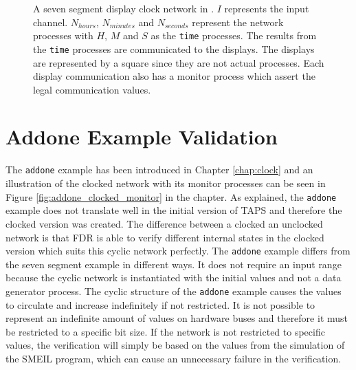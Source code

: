 \begin{figure}[!ht]
  \caption{A seven segment display clock network in \cspm{}. $I$ represents the input channel. $N_{hours}$, $N_{minutes}$ and $N_{seconds}$ represent the network processes with $H$, $M$ and $S$ as the \texttt{time} processes. The results from the \texttt{time} processes are communicated to the displays. The displays are represented by a square since they are not actual \cspm{} processes. Each display communication also has a monitor process which assert the legal communication values.}
  \label{fig:cspm-network}
\end{figure}


\section{Addone Example Validation}
The \texttt{addone} example has been introduced in Chapter \ref{chap:clock} and an illustration of the clocked network with its monitor processes can be seen in Figure \ref{fig:addone_clocked_monitor} in the chapter. As explained, the \texttt{addone} example does not translate well in the initial version of TAPS and therefore the clocked version was created.
The difference between a clocked an unclocked network is that FDR is able to verify different internal states in the clocked version which suits this cyclic network perfectly.
The \texttt{addone} example differs from the seven segment example in different ways. It does not require an input range because the cyclic network is instantiated with the initial values and not a data generator process. The cyclic structure of the \texttt{addone} example causes the values to circulate and increase indefinitely if not restricted. It is not possible to represent an indefinite amount of values on hardware buses and therefore it must be restricted to a specific bit size. If the network is not restricted to specific values, the verification will simply be based on the values from the simulation of the SMEIL program, which can cause an unnecessary failure in the verification. \\

